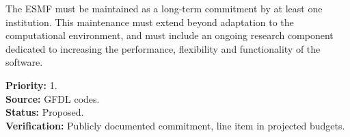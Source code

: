 The ESMF must be maintained as a long-term commitment by at least one
institution.  This maintenance must extend beyond adaptation to the 
computational environment, and must include an ongoing research component
dedicated to increasing the performance, flexibility and functionality of
the software.
\begin{reqlist}
{\bf Priority:} 1. \\
{\bf Source:} GFDL codes. \\
{\bf Status:} Proposed. \\
{\bf Verification:} Publicly documented commitment, line item in 
projected budgets.
\end{reqlist}






